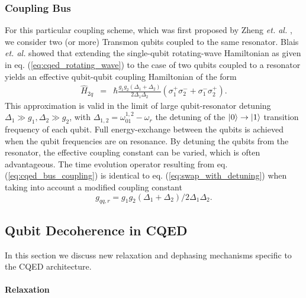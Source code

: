 \subsubsection{Coupling Bus}

For this particular coupling scheme, which was first proposed by Zheng {\it et. al.} \citep{zheng_efficient_2000,zheng_one-step_2001,osnaghi_coherent_2001}, we consider two (or more) Transmon qubits coupled to the same resonator. Blais {\it et. al.} \citep{blais_quantum-information_2007} showed that extending the single-qubit rotating-wave Hamiltonian as given in eq. (\ref{eq:cqed_rotating_wave}) to the case of two qubits coupled to a resonator yields an effective qubit-qubit coupling Hamiltonian of the form
%
\begin{eqnarray}
\hat{H}_{2q} & = & \hbar\frac{g_1 g_2(\Delta_1+\Delta_2)}{2\Delta_1\Delta_2}(\sigma_1^+\sigma_2^-+\sigma_1^-\sigma_2^+). \label{eq:cqed_bus_coupling}
\end{eqnarray}
%
This approximation is valid in the limit of large qubit-resonator detuning $\Delta_1 \gg g_1,\Delta_2 \gg g_2$, with $\Delta_{1,2} = \omega_{01}^{1,2}-\omega_r$ the detuning of the $\left| 0 \right>\to\left| 1 \right>$ transition frequency of each qubit. Full energy-exchange between the qubits is achieved when the qubit frequencies are on resonance. By detuning the qubits from the resonator, the effective coupling constant can be varied, which is often advantageous. The time evolution operator resulting from eq. (\ref{eq:cqed_bus_coupling}) is identical to eq. (\ref{eq:swap_with_detuning}) when taking into account a modified coupling constant
%
\begin{equation}
g_{qq,r}=g_1 g_2(\Delta_1+\Delta_2)/2\Delta_1\Delta_2. \label{eq:cqed_bus_coupling_rate}
\end{equation}
%
\subsection{Qubit Decoherence in CQED} \label{section:decoherence_in_cqed}

In this section we discuss new relaxation and dephasing mechanisms specific to the CQED architecture.

\paragraph{Relaxation}


